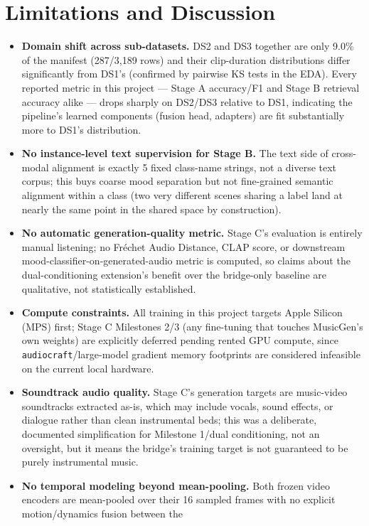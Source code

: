 \documentclass[11pt]{article}
\begin{document}
\section{Limitations and Discussion}
\begin{itemize}
  \item \textbf{Domain shift across sub-datasets.} DS2 and DS3 together are only 9.0\% of the
  manifest (287/3{,}189 rows) and their clip-duration distributions differ significantly from
  DS1's (confirmed by pairwise KS tests in the EDA). Every reported metric in this project ---
  Stage A accuracy/F1 and Stage B retrieval accuracy alike --- drops sharply on DS2/DS3 relative to
  DS1, indicating the pipeline's learned components (fusion head, adapters) are fit substantially
  more to DS1's distribution.
  \item \textbf{No instance-level text supervision for Stage B.} The text side of cross-modal
  alignment is exactly 5 fixed class-name strings, not a diverse text corpus; this buys coarse
  mood separation but not fine-grained semantic alignment within a class (two very different
  scenes sharing a label land at nearly the same point in the shared space by construction).
  \item \textbf{No automatic generation-quality metric.} Stage C's evaluation is entirely manual
  listening; no Fr\'echet Audio Distance, CLAP score, or downstream mood-classifier-on-generated-audio
  metric is computed, so claims about the dual-conditioning extension's benefit over the
  bridge-only baseline are qualitative, not statistically established.
  \item \textbf{Compute constraints.} All training in this project targets Apple Silicon (MPS)
  first; Stage C Milestones 2/3 (any fine-tuning that touches MusicGen's own weights) are
  explicitly deferred pending rented GPU compute, since \texttt{audiocraft}/large-model gradient
  memory footprints are considered infeasible on the current local hardware.
  \item \textbf{Soundtrack audio quality.} Stage C's generation targets are music-video soundtracks
  extracted as-is, which may include vocals, sound effects, or dialogue rather than clean
  instrumental beds; this was a deliberate, documented simplification for Milestone 1/dual
  conditioning, not an oversight, but it means the bridge's training target is not guaranteed to be
  purely instrumental music.
  \item \textbf{No temporal modeling beyond mean-pooling.} Both frozen video encoders are
  mean-pooled over their 16 sampled frames with no explicit motion/dynamics fusion between the

\end{itemize}
\end{document}

